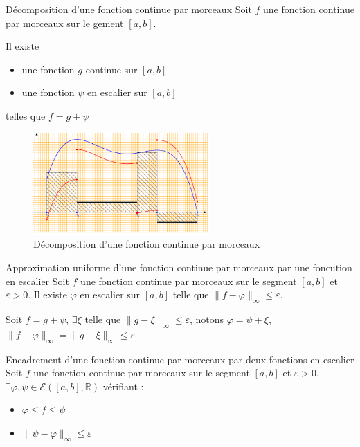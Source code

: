 \begin{Lenma}{Décomposition d'une fonction continue par morceaux}{}
  Soit $f$ une fonction continue par morceaux sur le gement $[a,b]$. 

Il existe 
\begin{itemize}

  \item une fonction $g$ continue sur $[a,b]$ 
  \item une fonction $\psi$ en escalier sur $[a,b]$

\end{itemize}
telles que $f = g + \psi$
  \begin{figure}[H] %
    \centering
    \includegraphics[width=0.6\textwidth]{./assets/Approximation d'une fonction 2.png}
    \caption{Décomposition d'une fonction continue par morceaux}
  \end{figure}
\end{Lenma}


\begin{Corollary}{Approximation uniforme d'une fonction continue par morceaux par une foncution en escalier}{}
  Soit $f$ une fonction continue par morceaux sur le segment $[a,b]$ et $\varepsilon>0$. Il existe $\varphi$ en escalier sur $[a,b]$ telle que $\| f-\varphi \| _{\infty} \le \varepsilon$.
\end{Corollary}
\begin{myproof}{}{}
Soit $f  = g + \psi$, $\exists \xi$ telle que $\| g - \xi \| _{\infty} \le \varepsilon$, notons $\varphi = \psi + \xi$, $\| f - \varphi \| _{\infty} = \| g - \xi \| _{\infty} \le \varepsilon$
\end{myproof}

\begin{Corollary}{Encadrement d'une fonction continue par morceaux par deux fonctions en escalier}{}
  Soit $f$ une fonction continue par morceaux sur le segment $[a,b]$ et $\varepsilon>0$. $\exists \varphi, \psi \in \mathcal{E}([a,b], \mathbb{R})$ vérifiant :
  \begin{itemize}

      \item $\varphi \le f \le \psi$ 
      \item $\| \psi - \varphi \| _{ \infty} \le \varepsilon$

  \end{itemize}
\end{Corollary}





